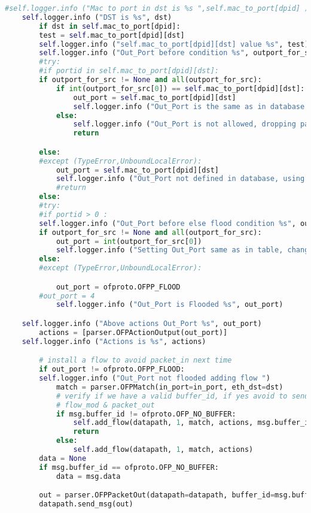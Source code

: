 \begin{lstlisting}[language = Python, caption={The User Segregation Mac Learning Application}, label={lst:userseg-code}]
	#self.logger.info ("Mac to port in dst is %s ",self.mac_to_port[dpid] )
	self.logger.info ("DST is %s", dst)
		if dst in self.mac_to_port[dpid]:
		test = self.mac_to_port[dpid][dst]
		self.logger.info ("self.mac_to_port[dpid][dst] value %s", test)
		self.logger.info ("Out_Port before condition %s", outport_for_src)
		#try:		
		#if portid in self.mac_to_port[dpid][dst]:
		if outport_for_src != None and all(outport_for_src):
			if int(outport_for_src[0]) == self.mac_to_port[dpid][dst]:
				out_port = self.mac_to_port[dpid][dst]
				self.logger.info ("Out_Port is the same as in database table %s", out_port)
			else:
				self.logger.info ("Out_Port is not allowed, dropping packet")	
				return

		else:
		#except (TypeError,UnboundLocalError):		
			out_port = self.mac_to_port[dpid][dst]		
			self.logger.info ("Out_Port not defined in database, using learned port")	
			#return
		else:
		#try:
		#if portid > 0 :
		self.logger.info ("Out_Port before else flood condition %s", outport_for_src)
		if outport_for_src != None and all(outport_for_src):
			out_port = int(outport_for_src[0])
			self.logger.info ("Setting Out_Port same as in table, changing flow %s", out_port)
		else:
		#except (TypeError,UnboundLocalError):

			out_port = ofproto.OFPP_FLOOD
		#out_port = 4
			self.logger.info ("Out_Port is Flooded %s", out_port)

	self.logger.info ("Above actions Out_Port %s", out_port)
		actions = [parser.OFPActionOutput(out_port)]
	self.logger.info ("Actions is %s", actions)

		# install a flow to avoid packet_in next time
		if out_port != ofproto.OFPP_FLOOD:
		self.logger.info ("Out_Port not flooded adding flow ")	
			match = parser.OFPMatch(in_port=in_port, eth_dst=dst)
			# verify if we have a valid buffer_id, if yes avoid to send both
			# flow_mod & packet_out
			if msg.buffer_id != ofproto.OFP_NO_BUFFER:
				self.add_flow(datapath, 1, match, actions, msg.buffer_id)
				return
			else:
				self.add_flow(datapath, 1, match, actions)
		data = None
		if msg.buffer_id == ofproto.OFP_NO_BUFFER:
			data = msg.data

		out = parser.OFPPacketOut(datapath=datapath, buffer_id=msg.buffer_id, in_port=in_port, actions=actions, data=data)
		datapath.send_msg(out)


\end{lstlisting}

